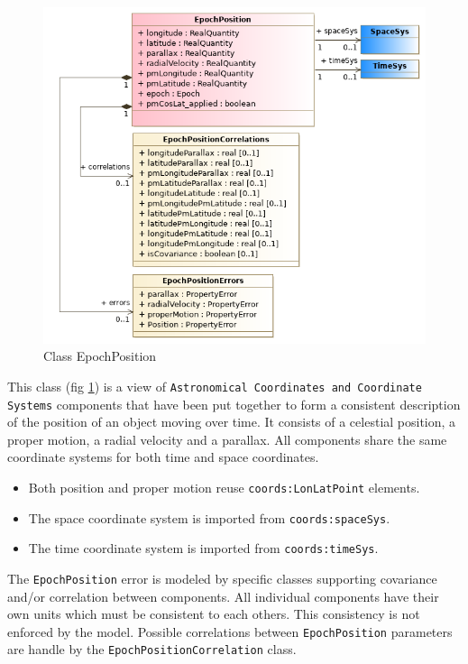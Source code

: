       \begin{figure}[h]
        \includegraphics[width=1.0\textwidth]{../model/EpochPosition.png}
        \caption{Class EpochPosition}
        \label{fig:EpochPosition}
      \end{figure}

    
  \label{sect:EpochPosition}
    This class (fig \ref{fig:EpochPosition}) is a view of \texttt{Astronomical Coordinates and Coordinate Systems} \citep{2022ivoa.specQ1004R} components that have been put together to form a consistent description of the position of an object moving over time. It consists of a celestial position, a proper motion, a radial velocity and a parallax. All components share the same coordinate systems for both time and space coordinates. \begin{itemize} \item Both position and proper motion reuse \texttt{coords:LonLatPoint} elements. \item The space coordinate system is imported from \texttt{coords:spaceSys}. \item The time coordinate system is imported from \texttt{coords:timeSys}. \end{itemize} The \texttt{EpochPosition} error is modeled by specific classes supporting covariance and/or correlation between components. All individual components have their own units which must be consistent to each others. This consistency is not enforced by the model. Possible correlations between \texttt{EpochPosition} parameters are handle by the \texttt{EpochPositionCorrelation} class.

